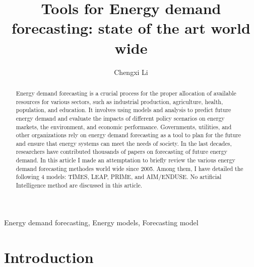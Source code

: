 \documentclass[lettersize,journal]{IEEEtran}
\begin{document}
\title{Tools for Energy demand forecasting: state of the art world wide}
\author{Chengxi Li}


\maketitle

\begin{abstract}
  Energy demand forecasting is a crucial process for the proper allocation of available resources for various sectors, such as industrial production, agriculture, health, population, and education. It involves using models and analysis to predict future energy demand and evaluate the impacts of different policy scenarios on energy markets, the environment, and economic performance. Governments, utilities, and other organizations rely on energy demand forecasting as a tool to plan for the future and ensure that energy systems can meet the needs of society. In the last decades, researchers have contributed thousands of papers on forecasting of future energy demand. In this article I made an attemptation to briefly review the various energy demand forecasting methodes world wide since 2005. Among them, I have detailed the following 4 models: TIMES, LEAP, PRIME, and AIM/ENDUSE. No artificial Intelligence method are discussed in this article.
  
\end{abstract}

\begin{IEEEkeywords}
Energy demand forecasting, Energy models, Forecasting model
\end{IEEEkeywords}


\section{Introduction}
\end{document}
